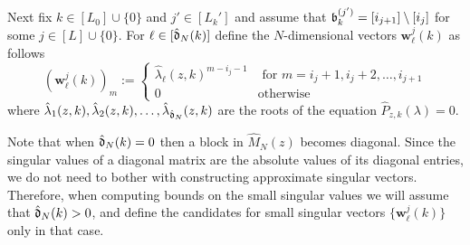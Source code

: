 \documentclass{amsart}
\numberwithin{equation}{section}
\def\corAB{}
\begin{document}
Next fix $k \in [L_0]\cup\{0\}$ and $j' \in [L_k']$ and assume that $\mathfrak{b}_k^{(j')}=[i_{j+1}]\setminus [i_j]$ for some $j \in [L] \cup\{0\}$. For $\ell \in [\hat{\mathfrak{d}}_N(k)]$ define the $N$-dimensional vectors ${\bm w}_\ell^j(k)$ as follows
\[
({\bm w}_\ell^{j}(k))_m:= \left\{	\begin{array}{ll} \hat{\lambda}_\ell(z,\corAB{k})^{m-i_j-1} & \mbox{ for } m=i_j+1,i_j+2,\ldots,i_{j+1}\\
0 & \mbox{otherwise}
\end{array}
\right.
\]
where $\hat{\lambda}_1(z,\corAB{k}), \hat{\lambda}_2(z,\corAB{k}), \ldots, \hat{\lambda}_{\hat\gd_N}(z,\corAB{k})$ are the roots of the equation $\hat{P}_{z,k}(\lambda)=0$. %


\begin{remark}
Note that
when $\hat{\mathfrak{d}}_N(k)=0$ then a block in $\hat{M}_N(z)$ becomes diagonal.
Since the singular values of a diagonal matrix are the
absolute values of its diagonal entries,
we do not need to bother with constructing
approximate singular vectors.
Therefore, when computing
bounds on the small singular values we will assume that $\hat{\mathfrak{d}}_N(k) >0$, and
define the candidates for small singular vectors $\{{\bm w}_\ell^j(k)\}$ only
in that case.
\end{remark}
\end{document}
